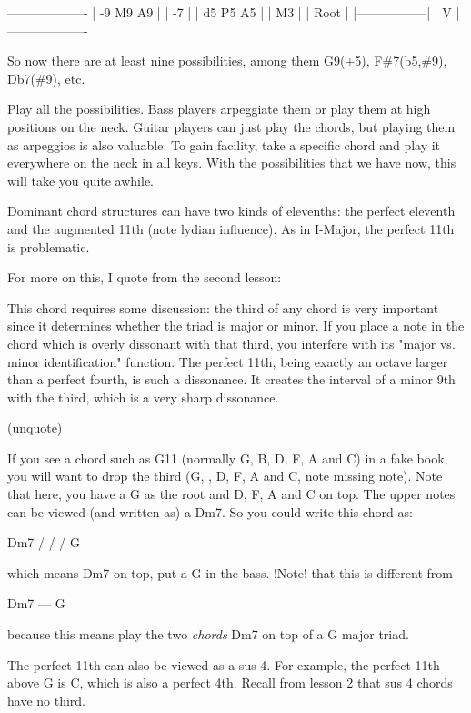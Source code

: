 -------------------
| -9    M9   A9   |
|       -7        |
|  d5   P5   A5   |
|       M3        |
|      Root       |
|-----------------|
|        V        |
-------------------

So now there are at least nine possibilities, among them G9(+5), F\#7(b5,\#9),
Db7(\#9), etc.

Play all the possibilities. Bass players arpeggiate them or play them at high
positions on the neck. Guitar players can just play the chords, but playing
them as arpeggios is also valuable. To gain facility, take a specific chord
and play it everywhere on the neck in all keys. With the possibilities that
we have now, this will take you quite awhile.

Dominant chord structures can have two kinds of elevenths: the perfect
eleventh and the augmented 11th (note lydian influence). As in I-Major,
the perfect 11th is problematic.

For more on this, I quote from the second lesson:

This chord requires some discussion: the third of any chord is very
important since it determines whether the triad is major or minor.
If you place a note in the chord which is overly dissonant with that
third, you interfere with its "major vs. minor identification" function.
The perfect 11th, being exactly an octave larger than a perfect fourth,
is such a dissonance. It creates the interval of a minor 9th with the
third, which is a very sharp dissonance.

(unquote)

If you see a chord such as G11 (normally G, B, D, F, A and C) in a fake book,
you will want to drop the third (G,  , D, F, A and C, note missing note). Note 
that here, you have a G as the root and D, F, A and C on top. The upper notes 
can be viewed (and written as) a Dm7. So you could write this chord as:

                Dm7 /
                   /
                  /  G

which means Dm7 on top, put a G in the bass. !Note! that this is different from

              Dm7
              ---
               G

because this means play the two \emph{chords} Dm7 on top of a G major triad.

The perfect 11th can also be viewed as a sus 4. For example, the perfect 11th
above G is C, which is also a perfect 4th. Recall from lesson 2 that sus 4
chords have no third.

